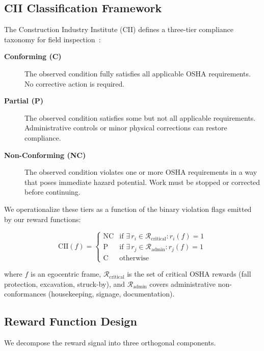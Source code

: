 \documentclass[sigconf,nonacm]{acmart}
\begin{document}
\subsection{CII Classification Framework}
\label{sec:cii}

The Construction Industry Institute (CII) defines a three-tier compliance
taxonomy for field inspection~\cite{cii2020safety}:

\begin{description}
  \item[\textbf{Conforming (C)}] The observed condition fully satisfies all
    applicable OSHA requirements. No corrective action is required.
  \item[\textbf{Partial (P)}] The observed condition satisfies some but not
    all applicable requirements. Administrative controls or minor physical
    corrections can restore compliance.
  \item[\textbf{Non-Conforming (NC)}] The observed condition violates one or
    more OSHA requirements in a way that poses immediate hazard potential.
    Work must be stopped or corrected before continuing.
\end{description}

We operationalize these tiers as a function of the binary violation flags
emitted by our reward functions:

\begin{equation}
  \text{CII}(f) =
  \begin{cases}
    \text{NC} & \text{if } \exists\, r_i \in \mathcal{R}_{\text{critical}}: r_i(f) = 1 \\
    \text{P}  & \text{if } \exists\, r_j \in \mathcal{R}_{\text{admin}}: r_j(f) = 1 \\
    \text{C}  & \text{otherwise}
  \end{cases}
  \label{eq:cii}
\end{equation}

where $f$ is an egocentric frame, $\mathcal{R}_{\text{critical}}$ is the
set of critical OSHA rewards (fall protection, excavation, struck-by), and
$\mathcal{R}_{\text{admin}}$ covers administrative non-conformances
(housekeeping, signage, documentation).

\subsection{Reward Function Design}
\label{sec:rewards}

We decompose the reward signal into three orthogonal components.
\end{document}
